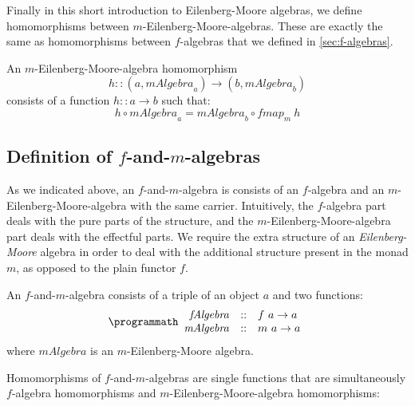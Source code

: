 Finally in this short introduction to Eilenberg-Moore algebras, we
define homomorphisms between $m$-Eilenberg-Moore-algebras. These are
exactly the same as homomorphisms between $f$-algebras that we defined
in \autoref{sec:f-algebras}.

\begin{definition}
  An $m$-Eilenberg-Moore-algebra homomorphism
  \begin{displaymath}
    h :: (a, \mathit{mAlgebra}_a) \to (b, \mathit{mAlgebra}_b)
  \end{displaymath}
  consists of a function $h :: a \to b$ such that:
  \begin{equation}
    \label{eq:em-alg-homomorphism}
    h \circ \mathit{mAlgebra}_a = \mathit{mAlgebra}_b \circ \mathit{fmap}_m~h
  \end{equation}
\end{definition}

\subsection{Definition of $f$-and-$m$-algebras}

As we indicated above, an $f$-and-$m$-algebra is consists of an
$f$-algebra and an $m$-Eilenberg-Moore-algebra with the same
carrier. Intuitively, the $f$-algebra part deals with the pure parts
of the structure, and the $m$-Eilenberg-Moore-algebra part deals with
the effectful parts. We require the extra structure of an
\emph{Eilenberg-Moore} algebra in order to deal with the additional
structure present in the monad $m$, as opposed to the plain functor
$f$.

\begin{definition}
  An $f$-and-$m$-algebra consists of a triple of an object $a$ and two
  functions:
  \begin{displaymath}
    \programmath
    \begin{array}{rcl}
      \mathit{fAlgebra} & :: & f~a \to a \\
      \mathit{mAlgebra} & :: & m~a \to a
    \end{array}
  \end{displaymath}
  where $\mathit{mAlgebra}$ is an $m$-Eilenberg-Moore algebra.
\end{definition}

Homomorphisms of $f$-and-$m$-algebras are single functions that are
simultaneously $f$-algebra homomorphisms and
$m$-Eilenberg-Moore-algebra homomorphisms:

